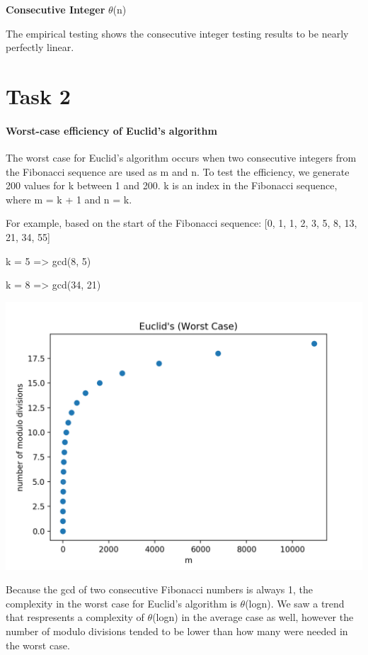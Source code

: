 \documentclass{report}
\begin{document}
\begin{flushleft}
		\textbf{Consecutive Integer} $\theta$(n)

		The empirical testing shows the consecutive integer testing results to be nearly perfectly linear.

		\section{Task 2}

		\paragraph{Worst-case efficiency of Euclid's algorithm}
		The worst case for Euclid's algorithm occurs when two consecutive integers from the Fibonacci sequence are used as m and n. To test
		the efficiency, we generate 200 values for k between 1 and 200. k is an index in the Fibonacci sequence, where m = k + 1 and n = k.

		For example, based on the start of the Fibonacci sequence: [0, 1, 1, 2, 3, 5, 8, 13, 21, 34, 55]

		k = 5 => gcd(8, 5)

		k = 8 => gcd(34, 21)

		\includegraphics{task2}

		Because the gcd of two consecutive Fibonacci numbers is always 1, the complexity in the worst case for Euclid's algorithm
		is $\theta$(logn). We saw a trend that respresents a complexity of $\theta$(logn) in the average case as well, however the number
		of modulo divisions tended to be lower than how many were needed in the worst case.


\end{flushleft}
\end{document}
